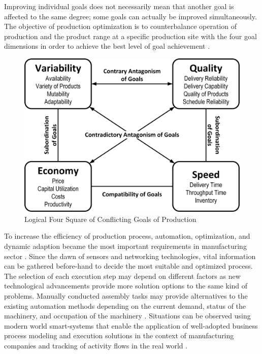 Improving individual goals does not necessarily mean that another goal is affected to the same degree; some goals can actually be improved simultaneously. The objective of production optimization is to counterbalance operation of production and the product range at a specific production site with the four goal dimensions in order to achieve the best level of goal achievement \cite{LEANFAC}.

\begin{figure}[h!]
	\includegraphics[scale=0.49]{./gfx/4goals}
	\centering
	\caption{Logical Four Square of Conflicting Goals of Production \cite{LEANFAC}}
	\label{fig:1.2}
\end{figure}

To increase the efficiency of production process, automation, optimization, and dynamic adaption became the most important requirements in manufacturing sector \cite{DBHENG}. Since the dawn of sensors and networking technologies, vital information can be gathered before-hand to decide the most suitable and optimized process. The selection of each execution step may depend on different factors as new technological advancements provide more solution options to the same kind of problems. Manually conducted assembly tasks may provide alternatives to the existing automation methods depending on the current demand, status of the machinery, and occupation of the machinery \cite{TIMURCIRP}. Situations can be observed using modern world smart-systems that enable the application of well-adopted business process modeling and execution  solutions in the context of manufacturing companies and tracking of activity flows in the real world \cite{CONWORKFLOW}.

